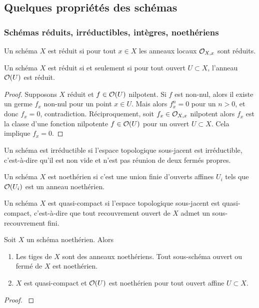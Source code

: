 \subsection{Quelques propriétés des schémas}

\subsubsection{Schémas réduits, irréductibles, intègres, noethériens}

\begin{defn}
Un schéma $X$ est réduit si pour tout $x\in X$ les anneaux locaux $\mathcal{O}_{X,x}$ sont réduits. 
\end{defn}

\begin{prop}
Un schéma $X$ est réduit si et seulement si pour tout ouvert $U\subset X$, l'anneau $\mathcal{O}(U)$ est réduit.
\end{prop}
\begin{proof}
Supposons $X$ réduit et $f\in \mathcal{O}(U)$ nilpotent. Si $f$ est non-nul, alors il existe un germe $f_x$ non-nul pour un point $x\in U$. Mais alors $f_x^n=0$ pour un $n>0$, et donc $f_x=0$, contradiction.
Réciproquement, soit $f_x\in \mathcal{O}_{X,x}$ nilpotent alors $f_x$ est la classe d'une fonction nilpotente $f\in \mathcal{O}(U)$ pour un ouvert $U\subset X$. Cela implique $f_x=0$.
\end{proof}

\begin{defn}
Un schéma est irréductible si l'espace topologique sous-jacent est irréductible, c'est-à-dire qu'il est non vide et n'est pas réunion de deux fermés propres.
\end{defn}

\begin{defn}
Un schéma $X$ est noethérien si c'est une union finie d'ouverts affines $U_i$ tels que $\mathcal{O}(U_i)$ est un anneau noethérien.
\end{defn}

\begin{defn}
Un schéma $X$ est quasi-compact si l'espace topologique sous-jacent est quasi-compact, c'est-à-dire que tout recouvrement ouvert de $X$ admet un sous-recouvrement fini. 
\end{defn}

\begin{prop}
Soit $X$ un schéma noethérien. Alors 
\begin{enumerate}
\item Les tiges de $X$ sont des anneaux noethériens. Tout sous-schéma ouvert ou fermé de $X$ est noethérien.
\item $X$ est quasi-compact et $\mathcal{O}(U)$ est noethérien pour tout ouvert affine $U\subset X$.
\end{enumerate}
\end{prop}
\begin{proof}
\cite[2.3.46]{QingLiu} 
\end{proof}


